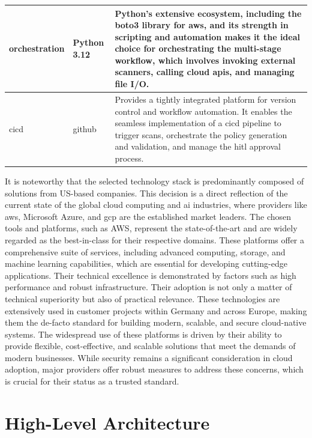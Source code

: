 \begin{center}
\begin{tabular}{|l|l|p{7cm}|}
\hline
\gls{orchestration} & Python 3.12 \cite{noauthor_whats_nodate} & Python's extensive ecosystem, including the \gls{boto3} library for \gls{aws}, and its strength in scripting and automation makes it the ideal choice for orchestrating the multi-stage workflow, which involves invoking external scanners, calling cloud \gls{api}s, and managing file I/O. \\
\hline
\gls{cicd} & \gls{github} \cite{noauthor_github_2025} & Provides a tightly integrated platform for version control and workflow automation. It enables the seamless implementation of a \gls{cicd} pipeline to trigger scans, orchestrate the policy generation and validation, and manage the \gls{hitl} approval process. \\
\hline
\end{tabular}
\label{tab:tech_stack}
\end{center}

It is noteworthy that the selected technology stack is predominantly composed of solutions from US-based companies. This decision is a direct reflection of the current state of the global cloud computing and \gls{ai} industries, where providers like \gls{aws}, Microsoft Azure, and \gls{gcp} are the established market leaders\cite{n_koritala_cloud-first_2025}. The chosen tools and platforms, such as AWS, represent the state-of-the-art and are widely regarded as the best-in-class for their respective domains. These platforms offer a comprehensive suite of services, including advanced computing, storage, and machine learning capabilities, which are essential for developing cutting-edge applications. Their technical excellence is demonstrated by factors such as high performance and robust infrastructure\cite{patel_comparative_nodate}. Their adoption is not only a matter of technical superiority but also of practical relevance. These technologies are extensively used in customer projects within Germany and across Europe, making them the de-facto standard for building modern, scalable, and secure \gls{cloud-native} systems\cite{noauthor_european_nodate}. The widespread use of these platforms is driven by their ability to provide flexible, cost-effective, and scalable solutions that meet the demands of modern businesses. While security remains a significant consideration in cloud adoption, major providers offer robust measures to address these concerns, which is crucial for their status as a trusted standard\cite{noauthor_european_nodate}.

\section{High-Level Architecture}

